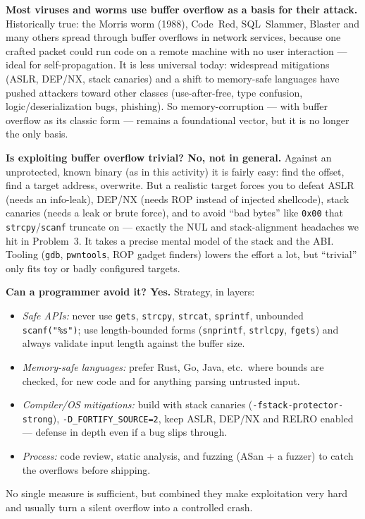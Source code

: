 \documentclass[a4paper, 10pt]{article}
\begin{document}
\begin{solution}
	\begin{subproblems}
		\item \textbf{Most viruses and worms use buffer overflow as a basis for their attack.}
			Historically true: the Morris worm (1988), Code~Red, SQL~Slammer, Blaster and many others
			spread through buffer overflows in network services, because one crafted packet could run code
			on a remote machine with no user interaction --- ideal for self-propagation. It is less
			universal today: widespread mitigations (ASLR, DEP/NX, stack canaries) and a shift to
			memory-safe languages have pushed attackers toward other classes (use-after-free, type
			confusion, logic/deserialization bugs, phishing). So memory-corruption --- with buffer overflow
			as its classic form --- remains a foundational vector, but it is no longer the only basis.

		\item \textbf{Is exploiting buffer overflow trivial? No, not in general.} Against an unprotected,
			known binary (as in this activity) it is fairly easy: find the offset, find a target address,
			overwrite. But a realistic target forces you to defeat ASLR (needs an info-leak), DEP/NX (needs
			ROP instead of injected shellcode), stack canaries (needs a leak or brute force), and to avoid
			``bad bytes'' like \texttt{0x00} that \texttt{strcpy}/\texttt{scanf} truncate on --- exactly the
			NUL and stack-alignment headaches we hit in Problem~3. It takes a precise mental model of the
			stack and the ABI. Tooling (\texttt{gdb}, \texttt{pwntools}, ROP gadget finders) lowers the
			effort a lot, but ``trivial'' only fits toy or badly configured targets.

		\item \textbf{Can a programmer avoid it? Yes.} Strategy, in layers:
			\begin{itemize}
				\item \emph{Safe APIs:} never use \texttt{gets}, \texttt{strcpy}, \texttt{strcat},
					\texttt{sprintf}, unbounded \texttt{scanf("\%s")}; use length-bounded forms
					(\texttt{snprintf}, \texttt{strlcpy}, \texttt{fgets}) and always validate input length
					against the buffer size.
				\item \emph{Memory-safe languages:} prefer Rust, Go, Java, etc.\ where bounds are checked,
					for new code and for anything parsing untrusted input.
				\item \emph{Compiler/OS mitigations:} build with stack canaries
					(\texttt{-fstack-protector-strong}), \texttt{-D\_FORTIFY\_SOURCE=2}, keep ASLR, DEP/NX and
					RELRO enabled --- defense in depth even if a bug slips through.
				\item \emph{Process:} code review, static analysis, and fuzzing (ASan + a fuzzer) to catch the
					overflows before shipping.
			\end{itemize}
			No single measure is sufficient, but combined they make exploitation very hard and usually
			turn a silent overflow into a controlled crash.
	\end{subproblems}
\end{solution}


\end{document}
